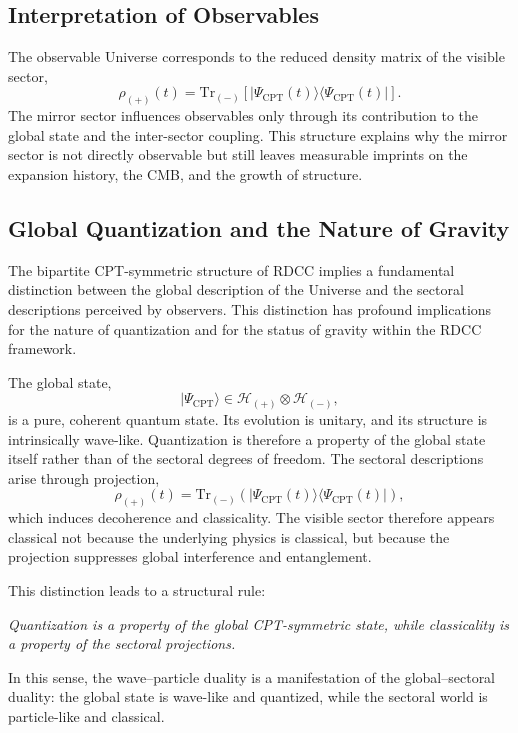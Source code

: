 \documentclass[11pt,a4paper]{article}
\begin{document}
\subsection{Interpretation of Observables}

The observable Universe corresponds to the reduced density matrix of the visible sector,
\begin{equation}
    \rho_{(+)}(t) = \mathrm{Tr}_{(-)}\left[|\Psi_{\mathrm{CPT}}(t)\rangle\langle\Psi_{\mathrm{CPT}}(t)|\right].
\end{equation}
The mirror sector influences observables only through its contribution to the global state and the inter-sector coupling. This structure explains why the mirror sector is not directly observable but still leaves measurable imprints on the expansion history, the CMB, and the growth of structure.

\subsection{Global Quantization and the Nature of Gravity}

The bipartite CPT-symmetric structure of RDCC implies a fundamental distinction between the
global description of the Universe and the sectoral descriptions perceived by observers. This
distinction has profound implications for the nature of quantization and for the status of gravity
within the RDCC framework.

The global state,
\begin{equation}
    |\Psi_{\mathrm{CPT}}\rangle \in \mathcal{H}_{(+)} \otimes \mathcal{H}_{(-)},
\end{equation}
is a pure, coherent quantum state. Its evolution is unitary, and its structure is intrinsically
wave-like. Quantization is therefore a property of the global state itself rather than of the
sectoral degrees of freedom. The sectoral descriptions arise through projection,
\begin{equation}
    \rho_{(+)}(t) = \mathrm{Tr}_{(-)}\!\left(|\Psi_{\mathrm{CPT}}(t)\rangle
    \langle\Psi_{\mathrm{CPT}}(t)|\right),
\end{equation}
which induces decoherence and classicality. The visible sector therefore appears classical not
because the underlying physics is classical, but because the projection suppresses global
interference and entanglement.

This distinction leads to a structural rule:
\begin{center}
\emph{Quantization is a property of the global CPT-symmetric state, while classicality is a
property of the sectoral projections.}
\end{center}
In this sense, the wave–particle duality is a manifestation of the global–sectoral duality: the
global state is wave-like and quantized, while the sectoral world is particle-like and classical.
\end{document}
